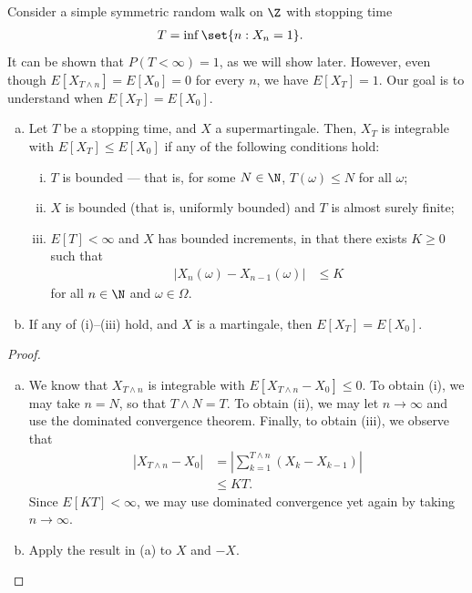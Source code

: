 \documentclass[10pt]{mypackage}
\begin{document}
Consider a simple symmetric random walk on $\Z$ with stopping time
\begin{align*}
  T &= \inf\set{n : X_n = 1}.
\end{align*}
It can be shown that $P\left( T < \infty \right) = 1$, as we will show later. However, even though $E\left[ X_{T\wedge n} \right] = E\left[ X_0 \right] = 0$ for every $n$, we have $E\left[ X_{T} \right] = 1$. Our goal is to understand when $E\left[ X_T \right] = E\left[ X_0 \right]$.
\begin{theorem}\hfill
  \begin{enumerate}[(a)]
    \item Let $T$ be a stopping time, and $X$ a supermartingale. Then, $X_T$ is integrable with $E\left[ X_T \right]\leq E\left[ X_0 \right]$ if any of the following conditions hold:
      \begin{enumerate}[(i)]
        \item $T$ is bounded --- that is, for some $N\in \N$, $T(\omega)\leq N$ for all $\omega$;
        \item $X$ is bounded (that is, uniformly bounded) and $T$ is almost surely finite;
        \item $E\left[ T \right] < \infty$ and $X$ has bounded increments, in that there exists $K \geq 0$ such that
          \begin{align*}
            \left\vert X_n\left( \omega \right)-X_{n-1}\left( \omega \right) \right\vert &\leq K
          \end{align*}
          for all $n\in \N$ and $\omega\in \Omega$.
      \end{enumerate}
    \item If any of (i)--(iii) hold, and $X$ is a martingale, then $E\left[ X_T \right] = E\left[ X_0 \right]$.
  \end{enumerate}
\end{theorem}
\begin{proof}\hfill
  \begin{enumerate}[(a)]
    \item We know that $X_{T\wedge n}$ is integrable with $E\left[ X_{T\wedge n}-X_0 \right]\leq 0$. To obtain (i), we may take $n = N$, so that $T\wedge N = T$. To obtain (ii), we may let $n\to\infty$ and use the dominated convergence theorem. Finally, to obtain (iii), we observe that
      \begin{align*}
        \left\vert X_{T\wedge n}-X_0 \right\vert &= \left\vert \sum_{k=1}^{T\wedge n} \left( X_k-X_{k-1} \right) \right\vert\\
                                                 &\leq KT.
      \end{align*}
      Since $E\left[ KT \right] < \infty$, we may use dominated convergence yet again by taking $n\to\infty$.
    \item Apply the result in (a) to $X$ and $-X$.
  \end{enumerate}
\end{proof}
\end{document}
